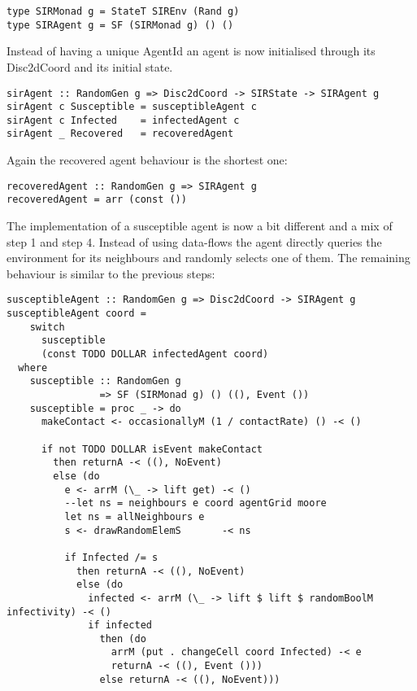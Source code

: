 \begin{verbatim}
type SIRMonad g = StateT SIREnv (Rand g)
type SIRAgent g = SF (SIRMonad g) () ()
\end{verbatim}

Instead of having a unique AgentId an agent is now initialised through its Disc2dCoord and its initial state. 

\begin{verbatim}
sirAgent :: RandomGen g => Disc2dCoord -> SIRState -> SIRAgent g
sirAgent c Susceptible = susceptibleAgent c
sirAgent c Infected    = infectedAgent c
sirAgent _ Recovered   = recoveredAgent
\end{verbatim}

Again the recovered agent behaviour is the shortest one:
\begin{verbatim}
recoveredAgent :: RandomGen g => SIRAgent g
recoveredAgent = arr (const ())
\end{verbatim}

The implementation of a susceptible agent is now a bit different and a mix of step 1 and step 4. Instead of using data-flows the agent directly queries the environment for its neighbours and randomly selects one of them. The remaining behaviour is similar to the previous steps:

\begin{verbatim}
susceptibleAgent :: RandomGen g => Disc2dCoord -> SIRAgent g
susceptibleAgent coord = 
    switch 
      susceptible
      (const TODO DOLLAR infectedAgent coord)
  where
    susceptible :: RandomGen g 
                => SF (SIRMonad g) () ((), Event ())
    susceptible = proc _ -> do
      makeContact <- occasionallyM (1 / contactRate) () -< ()

      if not TODO DOLLAR isEvent makeContact 
        then returnA -< ((), NoEvent)
        else (do
          e <- arrM (\_ -> lift get) -< ()
          --let ns = neighbours e coord agentGrid moore
          let ns = allNeighbours e
          s <- drawRandomElemS       -< ns

          if Infected /= s
            then returnA -< ((), NoEvent)
            else (do
              infected <- arrM (\_ -> lift $ lift $ randomBoolM infectivity) -< ()
              if infected 
                then (do
                  arrM (put . changeCell coord Infected) -< e
                  returnA -< ((), Event ()))
                else returnA -< ((), NoEvent)))
\end{verbatim}

